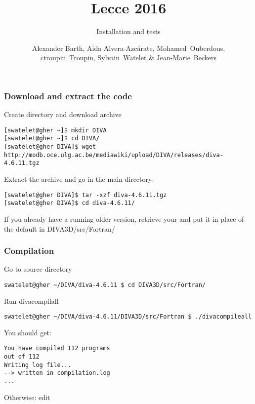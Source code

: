 
\parindent 0cm

\author[Alexander Barth, Aida Alvera-Azc\'{a}rate, Mohamed~Ouberdous, ctroupin~Troupin, Sylvain~Watelet \& Jean-Marie~Beckers]{Alexander Barth, Aida Alvera-Azc\'{a}rate, Mohamed~Ouberdous,\\
 ctroupin~Troupin, Sylvain~Watelet \& Jean-Marie~Beckers}
  
\title[]{\diva Lecce 2016}
\subtitle{Installation and tests}
\date{}


\maketitlepage %

\begin{frame}[fragile]
\frametitle{Download and extract the code}
\footnotesize

Create directory and download \diva archive 
\begin{lstlisting}[style=Bash]
[swatelet@gher ~]$ mkdir DIVA
[swatelet@gher ~]$ cd DIVA/
[swatelet@gher DIVA]$ wget http://modb.oce.ulg.ac.be/mediawiki/upload/DIVA/releases/diva-4.6.11.tgz
\end{lstlisting}

Extract the archive and go in the main directory:
\begin{lstlisting}[style=Bash]
[swatelet@gher DIVA]$ tar -xzf diva-4.6.11.tgz
[swatelet@gher DIVA]$ cd diva-4.6.11/
\end{lstlisting}
If you already have a running older version, retrieve your  and put it in place of the default in DIVA3D/src/Fortran/
\end{frame}

\begin{frame}[fragile]
\frametitle{Compilation}
\footnotesize

Go to source directory
\begin{lstlisting}[style=Bash]
swatelet@gher ~/DIVA/diva-4.6.11 $ cd DIVA3D/src/Fortran/
\end{lstlisting}

Run divacompilall \Coffeecup
\begin{lstlisting}[style=Bash]
swatelet@gher ~/DIVA/diva-4.6.11/DIVA3D/src/Fortran $ ./divacompileall
\end{lstlisting}

You should get:\\
\begin{verbatim}
You have compiled 112 programs
out of 112
Writing log file...
--> written in compilation.log
...
\end{verbatim}

Otherwise: edit 

\end{frame}

